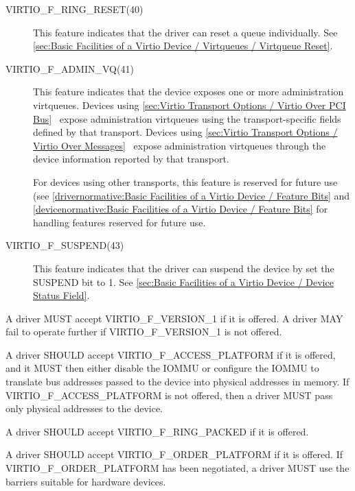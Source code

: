\begin{description}
  \item[VIRTIO_F_RING_RESET(40)] This feature indicates
  that the driver can reset a queue individually.
  See \ref{sec:Basic Facilities of a Virtio Device / Virtqueues / Virtqueue Reset}.

  \item[VIRTIO_F_ADMIN_VQ(41)] This feature indicates that the device exposes one or more
  administration virtqueues.
  Devices using \ref{sec:Virtio Transport Options / Virtio Over PCI
	  Bus}~
	  expose administration virtqueues using the transport-specific
	  fields defined by that transport. Devices using
	  \ref{sec:Virtio Transport Options / Virtio Over Messages}~
	  expose administration virtqueues through the device information
	  reported by that transport.

  For devices using other transports, this feature is reserved for
	  future use (see
	  \ref{drivernormative:Basic Facilities of a Virtio Device / Feature Bits}
	and
	\ref{devicenormative:Basic Facilities of a Virtio Device / Feature Bits} for
	handling features reserved for future use.

  \item[VIRTIO_F_SUSPEND(43)] This feature indicates that the driver can
   suspend the device by set the SUSPEND bit to 1.
   See \ref{sec:Basic Facilities of a Virtio Device / Device Status Field}.

\end{description}


A driver MUST accept VIRTIO_F_VERSION_1 if it is offered.  A driver
MAY fail to operate further if VIRTIO_F_VERSION_1 is not offered.

A driver SHOULD accept VIRTIO_F_ACCESS_PLATFORM if it is offered, and it MUST
then either disable the IOMMU or configure the IOMMU to translate bus addresses
passed to the device into physical addresses in memory.  If
VIRTIO_F_ACCESS_PLATFORM is not offered, then a driver MUST pass only physical
addresses to the device.

A driver SHOULD accept VIRTIO_F_RING_PACKED if it is offered.

A driver SHOULD accept VIRTIO_F_ORDER_PLATFORM if it is offered.
If VIRTIO_F_ORDER_PLATFORM has been negotiated, a driver MUST use
the barriers suitable for hardware devices.

